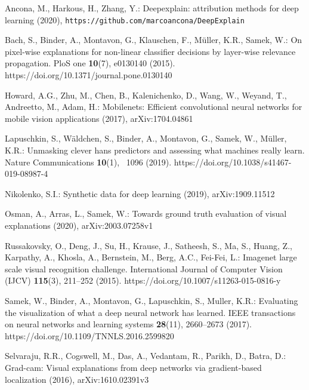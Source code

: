 \documentclass[runningheads]{llncs}
\begin{document}
%

\begin{thebibliography}{10}
\providecommand{\url}[1]{\texttt{#1}}
\providecommand{\urlprefix}{URL }
\providecommand{\doi}[1]{https://doi.org/#1}

Ancona, M., Harkous, H., Zhang, Y.: Deepexplain: attribution methods for deep
  learning (2020), \url{https://github.com/marcoancona/DeepExplain}

Bach, S., Binder, A., Montavon, G., Klauschen, F., M{\"u}ller, K.R., Samek, W.:
  On pixel-wise explanations for non-linear classifier decisions by layer-wise
  relevance propagation. PloS one  \textbf{10}(7),  e0130140 (2015).
  \doi{10.1371/journal.pone.0130140}

Howard, A.G., Zhu, M., Chen, B., Kalenichenko, D., Wang, W., Weyand, T.,
  Andreetto, M., Adam, H.: Mobilenets: Efficient convolutional neural networks
  for mobile vision applications (2017), arXiv:1704.04861

Lapuschkin, S., W{\"a}ldchen, S., Binder, A., Montavon, G., Samek, W.,
  M{\"u}ller, K.R.: Unmasking clever hans predictors and assessing what
  machines really learn. Nature Communications  \textbf{10}(1), ~1096 (2019).
  \doi{10.1038/s41467-019-08987-4}

Nikolenko, S.I.: Synthetic data for deep learning  (2019), arXiv:1909.11512

Osman, A., Arras, L., Samek, W.: Towards ground truth evaluation of visual
  explanations (2020), arXiv:2003.07258v1

Russakovsky, O., Deng, J., Su, H., Krause, J., Satheesh, S., Ma, S., Huang, Z.,
  Karpathy, A., Khosla, A., Bernstein, M., Berg, A.C., Fei-Fei, L.: Imagenet
  large scale visual recognition challenge. International Journal of Computer
  Vision (IJCV)  \textbf{115}(3),  211--252 (2015).
  \doi{10.1007/s11263-015-0816-y}

Samek, W., Binder, A., Montavon, G., Lapuschkin, S., Muller, K.R.: Evaluating
  the visualization of what a deep neural network has learned. IEEE
  transactions on neural networks and learning systems  \textbf{28}(11),
  2660--2673 (2017). \doi{10.1109/TNNLS.2016.2599820}

Selvaraju, R.R., Cogswell, M., Das, A., Vedantam, R., Parikh, D., Batra, D.:
  Grad-cam: Visual explanations from deep networks via gradient-based
  localization (2016), arXiv:1610.02391v3


\end{thebibliography}
\end{document}
